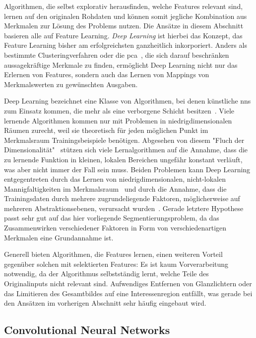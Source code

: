 Algorithmen, die selbst explorativ herausfinden, welche Features relevant sind, lernen auf den originalen Rohdaten und können somit jegliche Kombination aus Merkmalen zur Lösung des Problems nutzen.
Die Ansätze in diesem Abschnitt basieren alle auf Feature Learning.
\emph{Deep Learning} ist hierbei das Konzept, das Feature Learning bisher am erfolgreichsten ganzheitlich inkorporiert.
Anders als bestimmte Clusteringverfahren oder die \gls{pca}~\cite{Hotelling.1933}, die sich darauf beschränken aussagekräftige Merkmale zu finden, ermöglicht Deep Learning nicht nur das Erlernen von Features, sondern auch das Lernen von Mappings von Merkmalswerten zu gewünschten Ausgaben.

Deep Learning bezeichnet eine Klasse von Algorithmen, bei denen künstliche \glspl{nn} zum Einsatz kommen, die mehr als eine verborgene Schicht besitzen~\cite{Goodfellow.2016}.
Viele lernende Algorithmen kommen nur mit Problemen in niedrigdimensionalen Räumen zurecht, weil sie theoretisch für jeden möglichen Punkt im Merkmalsraum Trainingsbeispiele benötigen.
Abgesehen von diesem "Fluch der Dimensionalität"~\cite{Bellman.2010} stützen sich viele Lernalgorithmen auf die Annahme, dass die zu lernende Funktion in kleinen, lokalen Bereichen ungefähr konstant verläuft, was aber nicht immer der Fall sein muss.
Beiden Problemen kann Deep Learning entgegentreten durch das Lernen von niedrigdimensionalen, nicht-lokalen Mannigfaltigkeiten im Merkmalsraum~\cite{Bengio.2005} und durch die Annahme, dass die Trainingsdaten durch mehrere zugrundeliegende Faktoren, möglicherweise auf mehreren Abstraktionsebenen, verursacht wurden~\cite{Goodfellow.2016}.
Gerade letztere Hypothese passt sehr gut auf das hier vorliegende Segmentierungsproblem, da das Zusammenwirken verschiedener Faktoren in Form von verschiedenartigen Merkmalen eine Grundannahme ist.

Generell bieten Algorithmen, die Features lernen, einen weiteren Vorteil gegenüber solchen mit selektierten Features:
Es ist kaum Vorverarbeitung notwendig, da der Algorithmus selbstständig lernt, welche Teile des Originalinputs nicht relevant sind.
Aufwendiges Entfernen von Glanzlichtern oder das Limitieren des Gesamtbildes auf eine Interessenregion entfällt, was gerade bei den Ansätzen im vorherigen Abschnitt sehr häufig eingebaut wird.



\subsection{Convolutional Neural Networks}

